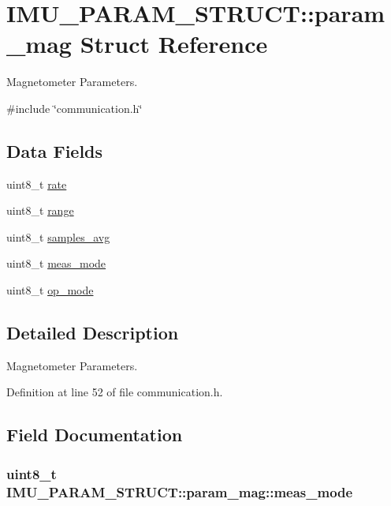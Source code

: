 \hypertarget{structIMU__PARAM__STRUCT_1_1param__mag}{
\section{IMU\_\-PARAM\_\-STRUCT::param\_\-mag Struct Reference}
\label{structIMU__PARAM__STRUCT_1_1param__mag}
}


Magnetometer Parameters.  




{\ttfamily \#include \char`\"{}communication.h\char`\"{}}

\subsection*{Data Fields}
\begin{DoxyCompactItemize}
\item 
uint8\_\-t \hyperlink{structIMU__PARAM__STRUCT_1_1param__mag_a234de95423b604b05b851ef90890cea1}{rate}
\item 
uint8\_\-t \hyperlink{structIMU__PARAM__STRUCT_1_1param__mag_a40ad27ebdb5fde35257b1dc52e40f476}{range}
\item 
uint8\_\-t \hyperlink{structIMU__PARAM__STRUCT_1_1param__mag_a52c22cae6940eb39fb72aca66cfeba9a}{samples\_\-avg}
\item 
uint8\_\-t \hyperlink{structIMU__PARAM__STRUCT_1_1param__mag_a1f3536709c05310005d648f339d70c54}{meas\_\-mode}
\item 
uint8\_\-t \hyperlink{structIMU__PARAM__STRUCT_1_1param__mag_a39b83b3e9ff5bdcafed0bdf6a2de584b}{op\_\-mode}
\end{DoxyCompactItemize}


\subsection{Detailed Description}
Magnetometer Parameters. 

Definition at line 52 of file communication.h.



\subsection{Field Documentation}
\hypertarget{structIMU__PARAM__STRUCT_1_1param__mag_a1f3536709c05310005d648f339d70c54}{
\subsubsection[{meas\_\-mode}]{\setlength{\rightskip}{0pt plus 5cm}uint8\_\-t {\bf IMU\_\-PARAM\_\-STRUCT::param\_\-mag::meas\_\-mode}}}
\label{structIMU__PARAM__STRUCT_1_1param__mag_a1f3536709c05310005d648f339d70c54}


